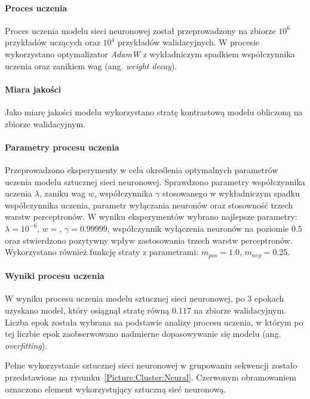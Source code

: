             \paragraph{Proces uczenia}
                Proces uczenia modelu sieci neuronowej został przeprowadzony na zbiorze $10^{6}$ przykładów uczących oraz $10^{4}$ przykładów walidacyjnych. 
                W procesie wykorzystano optymalizator \textit{AdamW}\cite{Loshchilov2017DecoupledWD} z wykładniczym spadkiem współczynnika uczenia oraz zanikiem wag (ang. \textit{weight decay}).
            
            \paragraph{Miara jakości}
                Jako miarę jakości modelu wykorzystano stratę kontrastową modelu obliczoną na zbiorze walidacyjnym.

            \paragraph{Parametry procesu uczenia}
                Przeprowadzono eksperymenty w celu określenia optymalnych parametrów uczenia modelu sztucznej sieci neuronowej. Sprawdzono parametry współczynnika uczenia $\lambda$, zaniku wag $w$, współczynnika $\gamma$ stosowanego w wykładniczym spadku współczynnika uczenia, parametr wyłączania neuronów oraz stosowność trzech warstw perceptronów. W wyniku eksperymentów wybrano najlepsze parametry: $\lambda = 10^{-6}$, $w = $, $\gamma=0.99999$, współczynnik wyłączenia neuronów na poziomie $0.5$ oraz stwierdzono pozytywny wpływ zastosowania trzech warstw perceptronów. 
                Wykorzystano również funkcję straty z parametrami: $m_{pos} = 1.0$, $m_{neg} = 0.25$.

            \paragraph{Wyniki procesu uczenia}
                
                W wyniku procesu uczenia modelu sztucznej sieci neuronowej, po 3 epokach uzyskano model, który osiągnął stratę równą $0.117$ na zbiorze walidacyjnym. Liczba epok została wybrana na podstawie analizy procesu uczenia, w którym po tej liczbie epok zaobserwowano nadmierne dopasowywanie się modelu (ang. \textit{overfitting}).


            Pełne wykorzystanie sztucznej sieci neuronowej w grupowaniu sekwencji zostało przedstawione na rysunku~\ref{Picture:Cluster:Neural}. Czerwonym obramowaniem oznaczono element wykorzystujący sztuczną sieć neuronową.

